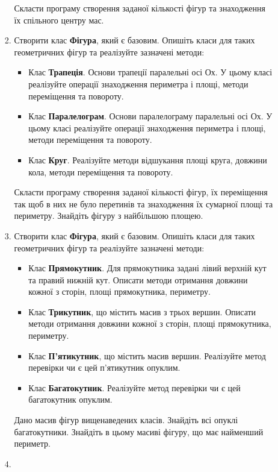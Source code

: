 \documentclass[a5paper,titlepage,openany,twoside,
]
{book_unv}%
\begin{document}
\begin{enumerate}
\begin{enumerate}
\begin{enumerate}
Скласти програму створення заданої кількості фігур та знаходження їх спільного центру мас.


\item
Створити клас \textbf{Фігура}, який є базовим.  Опишіть класи для 
таких геометричних фігур та реалізуйте зазначені методи:
\begin{itemize}
\item
  Клас \textbf{Трапеція}. Основи трапеції паралельні осі Ох. У цьому класі реалізуйте операції 
знаходження периметра і площі, методи переміщення та повороту.
\item
  Клас \textbf{Паралелограм}. Основи паралелограму паралельні осі Ох. 
У цьому класі реалізуйте операції знаходження периметра і площі, 
методи переміщення та повороту.
\item
  Клас \textbf{Круг}. Реалізуйте методи відшукання площі круга, довжини кола,
  методи переміщення та повороту.
\end{itemize}
Скласти програму створення заданої кількості фігур, їх переміщення так щоб в них не було
перетинів та знаходження їх сумарної площі та периметру. 
Знайдіть фігуру з найбільшою площею.


\item

Створити клас \textbf{Фігура}, який є базовим.  Опишіть класи для 
таких геометричних фігур та реалізуйте зазначені методи:
\begin{itemize}
\item
Клас \textbf{Прямокутник}. 
Для прямокутника задані лівий верхній кут та правий нижній кут.
Описати методи отримання довжини кожної з сторін, площі прямокутника,
периметру. 
\item
Клас \textbf{ Трикутник}, що містить масив з трьох вершин. 
Описати методи отримання довжини кожної з сторін, площі прямокутника,
периметру. 
\item
Клас \textbf{ П'ятикутник}, що містить масив вершин. 
Реалізуйте метод перевірки чи є цей п'ятикутник опуклим.
\item
Клас \textbf{ Багатокутник}. 
Реалізуйте метод перевірки чи є цей багатокутник опуклим.
\end{itemize}
Дано масив фігур вищенаведених класів. Знайдіть всі опуклі багатокутники.
Знайдіть в цьому масиві фігуру, що має найменший периметр.

\item


\end{enumerate}
\end{enumerate}
\end{enumerate}
\end{document}
